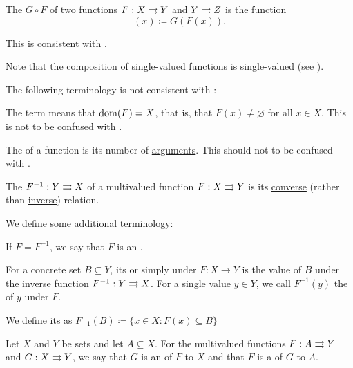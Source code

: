 \begin{definition}
\begin{DefEnum}[resume=def:function]
     The  \( G \circ F \) of two functions \( F: X \rightrightarrows Y \) and \( Y \rightrightarrows Z \) is the function
    \begin{equation*}
      [G \circ F](x) \coloneqq G(F(x)).
    \end{equation*}

    This is consistent with .

    Note that the composition of single-valued functions is single-valued (see ).
  \end{DefEnum}

  The following terminology is not consistent with :
  \begin{DefEnum}[resume=def:function]
     The term  means that \( \operatorname{dom}(F) = X \), that is, that \( F(x) \neq \varnothing \) for all \( x \in X \). This is not to be confused with .

     The  of a function is its number of \hyperref[def:function/arity]{arguments}. This should not to be confused with .

     The  \( F^{-1}: Y \rightrightarrows X \) of a multivalued function \( F: X \rightrightarrows Y \) is its \hyperref[def:binary_relation/converse]{converse} (rather than \hyperref[def:binary_relation/inverse]{inverse}) relation.
  \end{DefEnum}

  We define some additional terminology:
  \begin{DefEnum}[resume=def:function]
     If \( F = F^{-1} \), we say that \( F \) is an .

     For a concrete set \( B \subseteq Y \), its  or simply  under \( F: X \to Y \) is the value of \( B \) under the inverse function \( F^{-1}: Y \rightrightarrows X \). For a single value \( y \in Y \), we call \( F^{-1}(y) \) the  of \( y \) under \( F \).

    We define its  as \( F_{-1}(B) \coloneqq \{ x \in X \colon F(x) \subseteq B \} \)

     Let \( X \) and \( Y \) be sets and let \( A \subseteq X \). For the multivalued functions \( F: A \rightrightarrows Y \) and \( G: X \rightrightarrows Y \), we say that \( G \) is an  of \( F \) to \( X \) and that \( F \) is a  of \( G \) to \( A \).


\end{DefEnum}
\end{definition}
